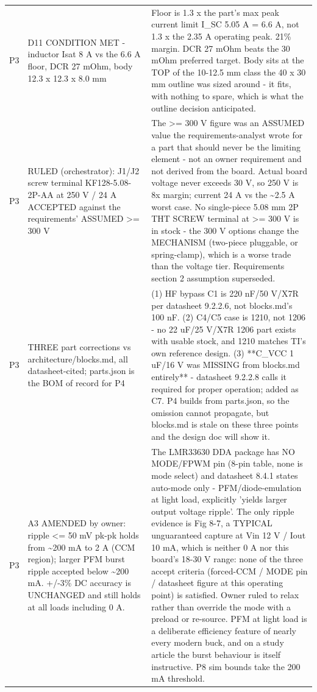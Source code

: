 \documentclass[11pt,a4paper]{article}
\begin{document}
{\begin{longtable}{lp{5.2cm}p{7.2cm}}
P3 & D11 CONDITION MET - inductor Isat 8 A vs the 6.6 A floor, DCR 27 mOhm, body 12.3 x 12.3 x 8.0 mm & Floor is 1.3 x the part's max peak current limit I\_SC 5.05 A = 6.6 A, not 1.3 x the 2.35 A operating peak. 21\% margin. DCR 27 mOhm beats the 30 mOhm preferred target. Body sits at the TOP of the 10-12.5 mm class the 40 x 30 mm outline was sized around - it fits, with nothing to spare, which is what the outline decision anticipated. \\
P3 & RULED (orchestrator): J1/J2 screw terminal KF128-5.08-2P-AA at 250 V / 24 A ACCEPTED against the requirements' ASSUMED \textgreater{}= 300 V & The \textgreater{}= 300 V figure was an ASSUMED value the requirements-analyst wrote for a part that should never be the limiting element - not an owner requirement and not derived from the board. Actual board voltage never exceeds 30 V, so 250 V is 8x margin; current 24 A vs the \textasciitilde{}2.5 A worst case. No single-piece 5.08 mm 2P THT SCREW terminal at \textgreater{}= 300 V is in stock - the 300 V options change the MECHANISM (two-piece pluggable, or spring-clamp), which is a worse trade than the voltage tier. Requirements section 2 assumption superseded. \\
P3 & THREE part corrections vs architecture/blocks.md, all datasheet-cited; parts.json is the BOM of record for P4 & (1) HF bypass C1 is 220 nF/50 V/X7R per datasheet 9.2.2.6, not blocks.md's 100 nF. (2) C4/C5 case is 1210, not 1206 - no 22 uF/25 V/X7R 1206 part exists with usable stock, and 1210 matches TI's own reference design. (3) {*}{*}C\_VCC 1 uF/16 V was MISSING from blocks.md entirely{*}{*} - datasheet 9.2.2.8 calls it required for proper operation; added as C7. P4 builds from parts.json, so the omission cannot propagate, but blocks.md is stale on these three points and the design doc will show it. \\
P3 & A3 AMENDED by owner: ripple \textless{}= 50 mV pk-pk holds from \textasciitilde{}200 mA to 2 A (CCM region); larger PFM burst ripple accepted below \textasciitilde{}200 mA. +/-3\% DC accuracy is UNCHANGED and still holds at all loads including 0 A. & The LMR33630 DDA package has NO MODE/FPWM pin (8-pin table, none is mode select) and datasheet 8.4.1 states auto-mode only - PFM/diode-emulation at light load, explicitly 'yields larger output voltage ripple'. The only ripple evidence is Fig 8-7, a TYPICAL unguaranteed capture at Vin 12 V / Iout 10 mA, which is neither 0 A nor this board's 18-30 V range: none of the three accept criteria (forced-CCM / MODE pin / datasheet figure at this operating point) is satisfied. Owner ruled to relax rather than override the mode with a preload or re-source. PFM at light load is a deliberate efficiency feature of nearly every modern buck, and on a study article the burst behaviour is itself instructive. P8 sim bounds take the 200 mA threshold. \\

\end{longtable}}
\end{document}
